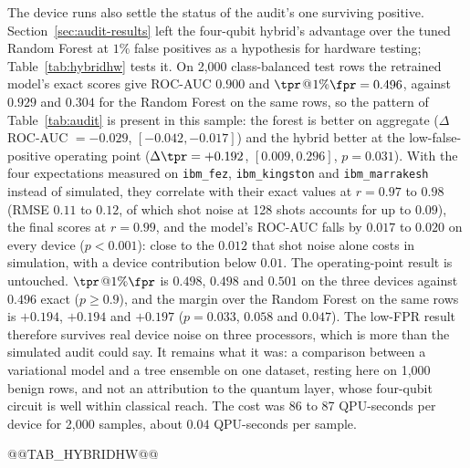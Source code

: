 The device runs also settle the status of the audit's one surviving positive.
Section~\ref{sec:audit-results} left the four-qubit hybrid's advantage over the tuned Random Forest at
$1\%$ false positives as a hypothesis for hardware testing; Table~\ref{tab:hybridhw} tests it. On
2{,}000 class-balanced test rows the retrained model's exact scores give ROC-AUC $0.900$ and
$\tpr$@$1\%\fpr=0.496$, against $0.929$ and $0.304$ for the Random Forest on the same rows, so the pattern
of Table~\ref{tab:audit} is present in this sample: the forest is better on aggregate ($\Delta$ROC-AUC
$=-0.029$, $[-0.042,-0.017]$) and the hybrid better at the low-false-positive operating point
($\Delta\tpr=+0.192$, $[0.009,0.296]$, $p=0.031$). With the four expectations measured on
\texttt{ibm\_fez}, \texttt{ibm\_kingston} and \texttt{ibm\_marrakesh} instead of simulated, they
correlate with their exact values at $r=0.97$ to $0.98$ (RMSE $0.11$ to $0.12$, of which shot noise at
128 shots accounts for up to $0.09$), the final scores at $r=0.99$, and the model's ROC-AUC falls by
$0.017$ to $0.020$ on every device ($p<0.001$): close to the $0.012$ that shot noise alone costs in
simulation, with a device contribution below $0.01$. The operating-point result is untouched.
$\tpr$@$1\%\fpr$ is $0.498$, $0.498$ and $0.501$ on the three devices against $0.496$ exact ($p\ge0.9$),
and the margin over the Random Forest on the same rows is $+0.194$, $+0.194$ and $+0.197$ ($p=0.033$,
$0.058$ and $0.047$). The low-FPR result therefore survives real device noise on three processors, which
is more than the simulated audit could say. It remains what it was: a comparison between a variational
model and a tree ensemble on one dataset, resting here on 1{,}000 benign rows, and not an attribution to
the quantum layer, whose four-qubit circuit is well within classical reach. The cost was 86 to 87
QPU-seconds per device for 2{,}000 samples, about $0.04$ QPU-seconds per sample.

@@TAB_HYBRIDHW@@
